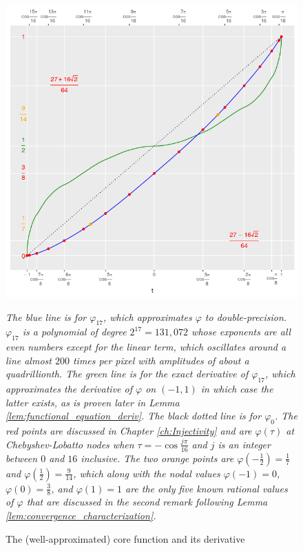 \begin{figure}
    \begin{center}
    \caption{The (well-approximated) core function and its derivative}
    \label{fig:core}
    \includegraphics[width=0.95\linewidth]{../images/core.png}
    \end{center}
    \emph{The blue line is for $\varphi_{17}$, which approximates $\varphi$ to double-precision. $\varphi_{17}$ is a polynomial of degree $2^{17} = 131,072$ whose exponents are all even numbers except for the linear term, which oscillates around a line almost $200$ times per pixel with amplitudes of about a quadrillionth. The green line is for the exact derivative of $\varphi_{17}$, which approximates the derivative of $\varphi$ on $\left(-1,1\right)$ in which case the latter exists, as is proven later in Lemma \ref{lem:functional_equation_deriv}. The black dotted line is for $\varphi_0$. The red points are discussed in Chapter \ref{ch:Injectivity} and are $\varphi\left(\tau\right)$ at Chebyshev-Lobatto nodes when $\tau = -\cos\frac{j\pi}{16}$ and $j$ is an integer between $0$ and $16$ inclusive. The two orange points are $\varphi\left(-\frac{1}{2}\right) = \frac{1}{7}$ and $\varphi\left(\frac{1}{2}\right) = \frac{9}{14}$, which along with the nodal values $\varphi\left(-1\right) = 0$, $\varphi\left(0\right) = \frac{3}{8}$, and $\varphi\left(1\right) = 1$ are the only five known rational values of $\varphi$ that are discussed in the second remark following Lemma \ref{lem:convergence_characterization}.}
\end{figure}

